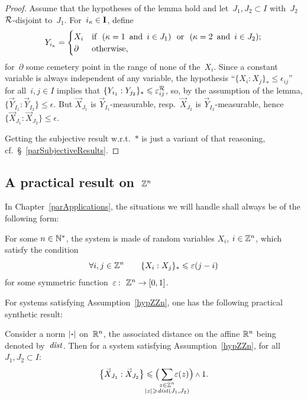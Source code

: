 \begin{proof}
Assume that the hypotheses of the lemma hold
and let~$J_1,J_2\subset I$ with~$J_2$ $\mathcal{R}$-disjoint to~$J_1$.
For~$i_{\kappa} \in \mathbf{I}$, define
\[ Y_{i_{\kappa}} = \begin{cases} X_i &
\text{if\ \ $(\kappa=1\enskip\text{and}\enskip i\in J_1)$\ \ or\ \ $(\kappa=2\enskip\text{and}\enskip i\in J_2)$;} \\
\partial & \text{otherwise,} \end{cases} \]
for~$\partial$ some cemetery point in the range of none of the~$X_i$.
Since a constant variable is always independent of any variable,
the hypothesis ``$\{X_i:X_j\}_* \leq \epsilon_{ij}$'' for all~$i,j \in I$
implies that ${\{Y_{i_1}:Y_{j_2}\}_{*}} \leqslant \varepsilon^{\mathcal{R}}_{ij}$,
so, by the assumption of the lemma, ${\{\vec{Y}_{I_1}:\vec{Y}_{I_2}\}} \leq \epsilon$.
But $\vec{X}_{J_1}$ is $\vec{Y}_{I_1}$-measurable,
resp.\ $\vec{X}_{J_2}$ is $\vec{Y}_{I_2}$-measurable,
hence $\{\vec{X}_{J_1}:\vec{X}_{J_2}\} \leq \epsilon$.

Getting the subjective result w.r.t.~$*$
is just a variant of that reasoning, cf.\ \S~\ref{parSubjectiveResults}.
\end{proof}


\subsection{A practical result on~\texorpdfstring{$\mathbb{Z}^n$}{Z\textasciicircum n}}\label{parPractical}

In Chapter~\ref{parApplications}, the situations we will handle
shall always be of the following form:
%
\begin{Hyp}\label{hypZZn}
For some $n\in\mathbb{N}^*$, the system is made of random variables $X_i$, $i\in\mathbb{Z}^n$,
which satisfy the condition
\[ \forall i,j\in\mathbb{Z}^n \qquad \{X_i:X_j\}_* \leqslant \varepsilon(j-i) \]
for some symmetric function~$\epsilon \colon \ZZ^n \to [0,1]$.
\end{Hyp}

For systems satisfying Assumption~\ref{hypZZn},
one has the following practical synthetic result:
%
\begin{Lem}\label{pro8882}
Consider a norm $|\Bcdot|$ on~$\mathbb{R}^n$,
the associated distance on the affine $\mathbb{R}^n$ being denoted by~$\mathit{dist}$.
Then for a system satisfying Assumption~\ref{hypZZn},
for all~$J_1,J_2\subset I$:
\[\label{for7041} \big\{ \vec{X}_{J_1} : \vec{X}_{J_2} \big\} \leq
\Big(\sum_{\mathclap{\substack{z\in\ZZ^n\\|z|\geq\dist(J_1,J_2)}}} \epsilon(z)\Big)
\wedge 1 .\]
\end{Lem}

